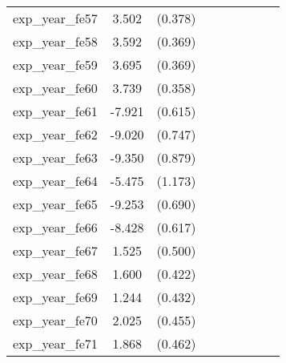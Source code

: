 {\begin{tabular}{l*{4}{cc}}
exp\_year\_fe57&    3.502\sym{***}&  (0.378)&                  &         &                  &         &                  &         \\
exp\_year\_fe58&    3.592\sym{***}&  (0.369)&                  &         &                  &         &                  &         \\
exp\_year\_fe59&    3.695\sym{***}&  (0.369)&                  &         &                  &         &                  &         \\
exp\_year\_fe60&    3.739\sym{***}&  (0.358)&                  &         &                  &         &                  &         \\
exp\_year\_fe61&   -7.921\sym{***}&  (0.615)&                  &         &                  &         &                  &         \\
exp\_year\_fe62&   -9.020\sym{***}&  (0.747)&                  &         &                  &         &                  &         \\
exp\_year\_fe63&   -9.350\sym{***}&  (0.879)&                  &         &                  &         &                  &         \\
exp\_year\_fe64&   -5.475\sym{***}&  (1.173)&                  &         &                  &         &                  &         \\
exp\_year\_fe65&   -9.253\sym{***}&  (0.690)&                  &         &                  &         &                  &         \\
exp\_year\_fe66&   -8.428\sym{***}&  (0.617)&                  &         &                  &         &                  &         \\
exp\_year\_fe67&    1.525\sym{**} &  (0.500)&                  &         &                  &         &                  &         \\
exp\_year\_fe68&    1.600\sym{***}&  (0.422)&                  &         &                  &         &                  &         \\
exp\_year\_fe69&    1.244\sym{**} &  (0.432)&                  &         &                  &         &                  &         \\
exp\_year\_fe70&    2.025\sym{***}&  (0.455)&                  &         &                  &         &                  &         \\
exp\_year\_fe71&    1.868\sym{***}&  (0.462)&                  &         &                  &         &                  &         \\

\end{tabular}}
